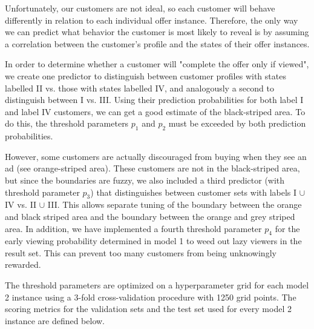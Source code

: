 \documentclass[11pt]{article} %
\begin{document}
Unfortunately, our customers are not ideal, so each customer will behave differently in relation to each individual offer instance.
Therefore, the only way we can predict what behavior the customer is most likely to reveal is by assuming a correlation between the customer's profile and the states of their offer instances.

In order to determine whether a customer will "complete the offer only if viewed", we create one predictor to distinguish between customer profiles with states labelled II vs. those with states labelled IV, and analogously a second to distinguish between I vs. III.
Using their prediction probabilities for both label I and label IV customers, we can get a good estimate of the black-striped area. To do this, the threshold parameters $p_1$ and $p_2$ must be exceeded by both prediction probabilities.


However, some customers are actually discouraged from buying when they see an ad (see orange-striped area). These customers are not in the black-striped area, but since the boundaries are fuzzy, we
also included a third predictor (with threshold parameter $p_3$) that distinguishes between customer sets with labels I $\cup$ IV vs. II $\cup$ III. This allows separate tuning of the boundary between the orange and black striped area and the boundary between the orange and grey striped area. In addition, we have implemented a fourth threshold parameter $p_4$ for the early viewing probability determined in model 1 to weed out lazy viewers in the result set.
This can prevent too many customers from being unknowingly rewarded.

The threshold parameters are optimized on a hyperparameter grid for each model 2 instance using a 3-fold cross-validation procedure with 1250 grid points.
The scoring metrics for the validation sets and the test set used for every model 2 instance are defined below.
\end{document}
